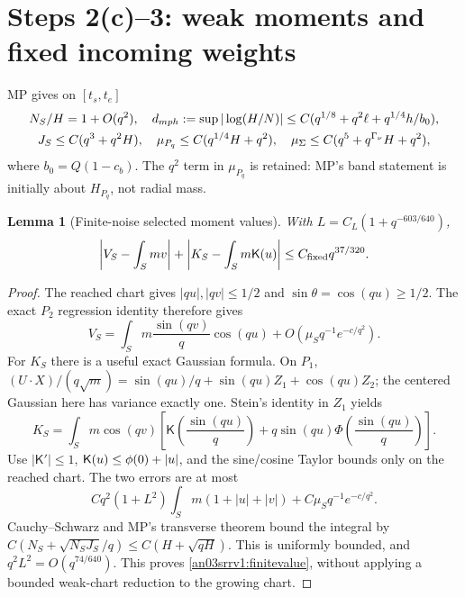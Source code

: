 \documentclass[11pt]{article}
\numberwithin{equation}{section}
\newtheorem{lemma}[theorem]{Lemma}\newtheorem{proposition}[theorem]{Proposition}
\theoremstyle{remark}\newtheorem{remark}[theorem]{Remark}
\newcommand{\Kfun}{\mathsf K}\newcommand{\Ffun}{\mathsf F}
\begin{document}
\section{Steps 2(c)--3: weak moments and fixed incoming weights}
\label{an03srrv1:momentsection}
MP gives on $[t_s,t_e]$
\begin{gather}
 N_S/H=1+O(q^2),\quad
 d_{
m ph}:=\sup|\log(H/N)|
 \le C(q^{1/8}+q^2\ell+q^{1/4}h/b_0),\notag\\
 J_S\le C(q^3+q^2H),\quad
 \mu_{P_q}\le C(q^{1/4}H+q^2),\quad
 \mu_\Sigma\le C(q^5+q^{\Gamma_\nu}H+q^2),
 \label{an03srrv1:MPinputs}
\end{gather}
where $b_0=Q(1-c_b)$. The $q^2$ term in $\mu_{P_q}$ is retained:
MP's band statement is initially about $H_{P_q}$, not radial mass.

\begin{lemma}[Finite-noise selected moment values]
\label{an03srrv1:finiteweak}
With $L=C_L(1+q^{-603/640})$,
\begin{equation}
 \left|V_S-\int_S mv\right|+
 \left|K_S-\int_Sm\Kfun(u)\right|
 \le C_{\rm fixed}q^{37/320}.
 \label{an03srrv1:finitevalue}
\end{equation}
\end{lemma}
\begin{proof}
The reached chart gives $|qu|,|qv|\le1/2$ and
$\sin\theta=\cos(qu)\ge1/2$. The exact $P_2$ regression identity
therefore gives
\[
 V_S=\int_Sm\frac{\sin(qv)}q\cos(qu)
                      +O(\mu_Sq^{-1}e^{-c/q^2}).
\]
For $K_S$ there is a useful exact Gaussian formula. On $P_1$,
$(U\cdot X)/(q\sqrt m)=\sin(qu)/q+\sin(qu)Z_1+\cos(qu)Z_2$;
the centered Gaussian here has variance exactly one. Stein's identity
in $Z_1$ yields
\begin{equation}
 K_S=\int_Sm\cos(qv)\left[
 \Kfun\left(\frac{\sin(qu)}q\right)
 +q\sin(qu)\Phi\left(\frac{\sin(qu)}q\right)\right].
 \label{an03srrv1:Kexact}
\end{equation}
Use $|\Kfun'|\le1$, $\Kfun(u)\le\ph+|u|$, and the sine/cosine
Taylor bounds only on the reached chart. The two errors are at most
\[
 Cq^2(1+L^2)\int_Sm(1+|u|+|v|)
                  +C\mu_Sq^{-1}e^{-c/q^2}.
\]
Cauchy--Schwarz and MP's transverse theorem bound the integral by
$C(N_S+\sqrt{N_SJ_S}/q)\le C(H+\sqrt{qH})$.
This is uniformly bounded, and $q^2L^2=O(q^{74/640})$.
This proves \eqref{an03srrv1:finitevalue}, without applying a bounded
weak-chart reduction to the growing chart.
\end{proof}
\end{document}
